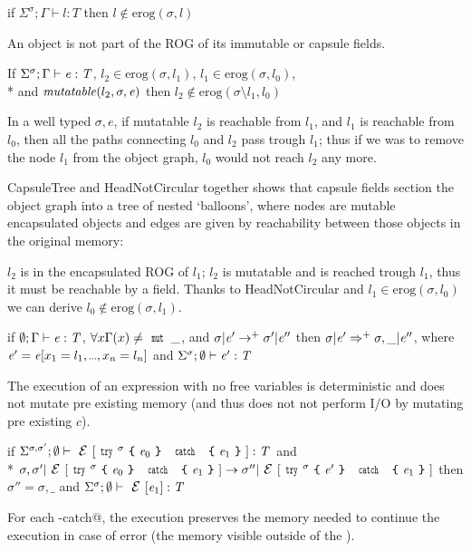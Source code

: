 \begin{Assumption}[HeadNotCircular]
if
$\Sigma^\sigma;\Gamma\vdash l:T$
then $l\notin\text{erog}(\sigma,l)$
\end{Assumption}
\noindent
\noindent An object is not part of the ROG of its immutable or capsule fields.


\begin{Assumption}[CapsuleTree]
If   $\Sigma^\sigma;\Gamma\vdash \e:\T$,
$l_2\in\text{erog}(\sigma,l_1)$,
$l_1\in\text{erog}(\sigma,l_0)$,\\*
and
$\mathit{mutatable}(l_2,\sigma,\e)$
then 
$l_2\notin\text{erog}(\sigma\setminus l_1,l_0)$
\end{Assumption}
\noindent In a well typed $\sigma,e$, if mutatable $l_2$ is reachable from
$l_1$, and $l_1$ is reachable from $l_0$,
then all the paths connecting $l_0$ and $l_2$ pass trough $l_1$; thus
if we was to remove the node $l_1$ from the object graph, $l_0$ would not reach $l_2$ any more.


CapsuleTree and HeadNotCircular together 
shows that capsule fields section the object graph into a tree of nested `balloons',
where nodes are mutable encapsulated objects and
edges are given by reachability between those objects in the original memory:

$l_2$ is in the encapsulated ROG of $l_1$;
$l_2$ is mutatable and is reached trough $l_1$, thus
it must be reachable by a \Q@capsule@ field.
Thanks to HeadNotCircular and $l_1\in\text{erog}(\sigma,l_0)$ we can derive 
$l_0\notin\text{erog}(\sigma,l_1)$.



\begin{Assumption}[Determinism]
if $\emptyset;\Gamma\vdash \e:\T$, 
$\forall x \Gamma(x)\neq\Kw{mut}\,\_$, and
$\sigma | \e'\rightarrow^+ \sigma' | \e''$
then 
$\sigma | \e'\Rightarrow^+ \sigma,\_ | \e''$,
where $\e'=\e[x_1=l_1,\ldots,x_n=l_n]$ and $\Sigma^\sigma;\emptyset\vdash \e':\T$
\end{Assumption}
\noindent The execution of an expression
with no \Q@mut@ free variables is deterministic and does not
  mutate pre existing memory (and thus does not not perform I/O by mutating pre existing $c$).


\begin{Assumption}[StrongExceptionSafety]
if $\Sigma^{\sigma,\sigma'};\emptyset\vdash \ctx[\Kw{try}^\sigma\oC\e_0\cC\ \Kw{catch}\ \oC\e_1\cC]:\T$
and\\*
$
\sigma,\sigma'|\ctx[\Kw{try}^\sigma\oC\e_0\cC\ \Kw{catch}\ \oC\e_1\cC]\rightarrow 
\sigma''|\ctx[\Kw{try}^\sigma\oC\e'\cC\ \Kw{catch}\ \oC\e_1\cC]
$
then 
$\sigma''=\sigma,\_$
and
$\Sigma^\sigma;\emptyset\vdash \ctx[\e_1]:\T$
\end{Assumption}
\noindent
For each \Q@try-catch@, the execution preserves the memory needed to continue the execution in case of error
(the memory visible outside of the \Q@try@).%


